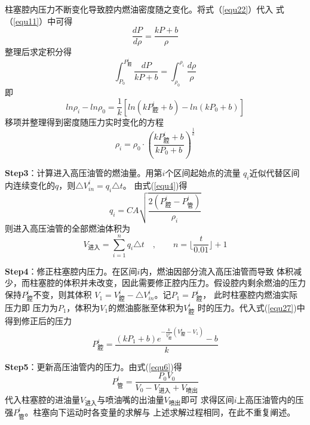 \documentclass[withoutpreface,bwprint]{cumcmthesis} %
\begin{document}
    柱塞腔内压力不断变化导致腔内燃油密度随之变化。将式（\ref{equ22}）代入
    式（\ref{equ11}）中可得
    \begin{equation}
        \frac{dP}{d\rho}=\frac{kP+b}{\rho}
    \label{equ31}
    \end{equation}
    整理后求定积分得
    \begin{equation}
        \int_{P_0}^{P_{\text{腔}}^i}\frac{dP}{kP+b}=\int_{\rho_0}^{\rho_i}\frac{d\rho}{\rho}
    \label{equ32}
    \end{equation}
    即
    \begin{equation}
        ln\rho_i-ln\rho_0=\frac{1}{k}[ln(kP_{\text{腔}}^i+b)-ln(kP_0+b)]
    \label{equ33}
    \end{equation} 
    移项并整理得到密度随压力实时变化的方程
    \begin{equation}
        \rho_i=\rho_0\cdot(\frac{kP_{\text{腔}}^i+b}{kP_0+b})^{\frac{1}{k}}
    \label{rho}
    \end{equation} 
   

    \textbf{Step3}：计算进入高压油管的燃油量。用第$i$个区间起始点的流量
    $q_i$近似代替区间内连续变化的$q$，则$\triangle V_{in}^i=q_i\triangle t$。
    由式(\ref{equ4})得
    \begin{equation}
        q_i=CA\sqrt{\frac{2(P_{\text{腔}}^i-P_{\text{管}}^i)}{\rho_i}}
    \label{equ35}
    \end{equation} 
    则进入高压油管的全部燃油体积为
    \begin{equation}
        V_{\text{进入}}= \sum\limits_{i=1}^n q_i\triangle t
        \quad , \quad \quad n={\lfloor{\frac{t}{0.01}}\rfloor+1}
    \label{equ36}
    \end{equation} 

    
    \textbf{Step4}：修正柱塞腔内压力。在区间$i$内，燃油因部分流入高压油管而导致
    体积减少，而柱塞腔的体积并未改变，因此需要修正腔内压力。假设腔内剩余燃油的压力
    保持$P_{\text{腔}}^i$不变，则其体积
    $V_1=V_{\text{腔}}^i-\triangle V_{in}^i$。记$P_1=P_{\text{腔}}^i$，
    此时柱塞腔内燃油实际压力即
    压力为$P_1$，体积为$V_1$的燃油膨胀至体积为$V_{\text{腔}}^i$
    时的压力。代入式(\ref{equ27})中得到修正后的压力
    \begin{equation}
        P_{\text{腔}}^i=\frac{(kP_1+b)e^{-\frac{k}{V_{\text{腔}}^i}(V_{\text{腔}}^i-V_1)}-b}{k}
    \label{equ37}
    \end{equation}

    \textbf{Step5}：更新高压油管内的压力。由式(\ref{equ6})得
    \begin{equation}
        P_{\text{管}}^i=\frac{P_0V_0}{V_0-V_{\text{进入}}+V_{\text{喷出}}}
    \label{equ38}
    \end{equation}
    代入柱塞腔的进油量$V_{\text{进入}}$与喷油嘴的出油量$V_{\text{喷出}}$即可
    求得区间$i$上高压油管内的压强$P_{\text{管}}^i$。柱塞向下运动时各变量的求解与
    上述求解过程相同，在此不重复阐述。
\end{document}
